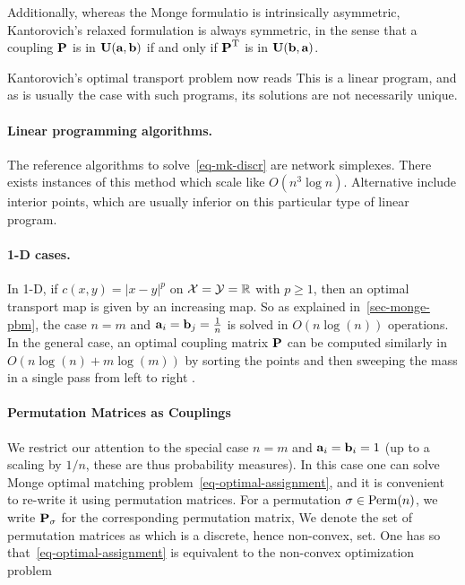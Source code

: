 %
Additionally, whereas the Monge formulatio is intrinsically asymmetric, Kantorovich's relaxed formulation is always symmetric, in the sense that a coupling $\P$ is in  $\CouplingsD(\a,\b)$ if and only if  $\transp{\P}$ is in $\CouplingsD(\b,\a)$.

Kantorovich's optimal transport problem now reads
This is a linear program, and as is usually the case with such programs, its solutions are not necessarily unique. 



\paragraph{Linear programming algorithms.}

The reference algorithms to solve~\eqref{eq-mk-discr} are network simplexes. There exists instances of this method which scale like  $O(n^3 \log n)$. Alternative include interior points, which are usually inferior on this particular type of linear program.

\paragraph{1-D cases.}

In 1-D, if $c(x,y)=|x-y|^p$ on $\Xx=\Yy=\RR$ with $p \geq 1$, then an optimal transport map is given by an increasing map. So as explained in~\eqref{sec-monge-pbm}, the case $n=m$ and $\a_i=\b_j=\frac{1}{n}$ is solved in $O(n \log(n))$ operations. 
%
In the general case, an optimal coupling matrix $\P$ can be computed similarly in $O(n\log(n)+m\log(m))$ by sorting the points and then sweeping the mass in a single pass from left to right .


\paragraph{Permutation Matrices as Couplings} 

We restrict our attention to the special case $n=m$ and $\a_i=\b_i=1$ (up to a scaling by $1/n$, these are thus probability measures).
%
In this case one can solve Monge optimal matching problem~\eqref{eq-optimal-assignment}, and it is convenient to re-write it using permutation matrices. 
%
For a permutation $\si\in\Perm(n)$, we write $\P_{\si}$ for the corresponding permutation matrix,
We denote the set of permutation matrices as
which is a discrete, hence non-convex, set. One has
so that~\eqref{eq-optimal-assignment} is equivalent to the non-convex optimization problem

